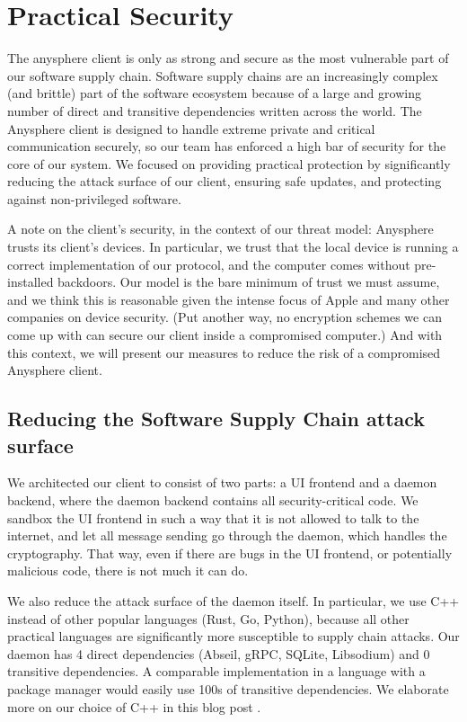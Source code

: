 \section{Practical Security}

The anysphere client is only as strong and secure as the most vulnerable part of our software supply chain. Software supply chains are an increasingly complex (and brittle) part of the software ecosystem because of a large and growing number of direct and transitive dependencies written across the world. 
The Anysphere client is designed to handle extreme private and critical communication securely, so our team has enforced a high bar of security for the core of our system. We focused on providing practical protection by significantly reducing the attack surface of our client, ensuring safe updates, and protecting against non-privileged software. 

A note on the client's security, in the context of our threat model: Anysphere trusts its client's devices. 
In particular, we trust that the local device is running a correct implementation of our protocol, and the computer comes without pre-installed backdoors. 
Our model is the bare minimum of trust we must assume, and we think this is reasonable given the intense focus of Apple and many other companies on device security. 
(Put another way, no encryption schemes we can come up with can secure our client inside a compromised computer.)
And with this context, we will present our measures to reduce the risk of a compromised Anysphere client.

\subsection{Reducing the Software Supply Chain attack surface}

We architected our client to consist of two parts: a UI frontend and a daemon backend, where the daemon backend contains all security-critical code. We sandbox the UI frontend in such a way that it is not allowed to talk to the internet, and let all message sending go through the daemon, which handles the cryptography. That way, even if there are bugs in the UI frontend, or potentially malicious code, there is not much it can do.


We also reduce the attack surface of the daemon itself. In particular, we use C++ instead of other popular languages (Rust, Go, Python), because all other practical languages are significantly more susceptible to supply chain attacks. Our daemon has 4 direct dependencies (Abseil, gRPC, SQLite, Libsodium) and 0 transitive dependencies. A comparable implementation in a language with a package manager would easily use 100s of transitive dependencies. We elaborate more on our choice of C++ in this blog post .

